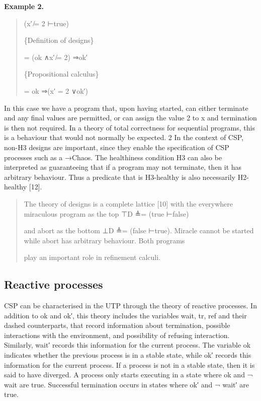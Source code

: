 \documentclass[11pt]{article}
\begin{document}
\noindent\textbf{Example 2.}


\begin{quote}\small\raggedright
(x′ ̸= 2 ⊢true)
\par
\{Definition of designs\}
\par
= (ok ∧x′ ̸= 2) ⇒ok′
\par
\{Propositional calculus\}
\par
= ok ⇒(x′ = 2 ∨ok′)
\end{quote}

In this case we have a program that, upon having started, can either terminate and any final values are permitted, or can assign the value 2 to x and termination is then not required. In a theory of total correctness for sequential programs, this is a behaviour that would not normally be expected. 2 In the context of CSP, non-H3 designs are important, since they enable the specification of CSP processes such as a →Chaos. The healthiness condition H3 can also be interpreted as guaranteeing that if a program may not terminate, then it has arbitrary behaviour. Thus a predicate that is H3-healthy is also necessarily H2-healthy [12].

\begin{quote}\small\raggedright
The theory of designs is a complete lattice [10] with the everywhere miraculous program as the top ⊤D ≜= (true ⊢false)
\par
and abort as the bottom ⊥D ≜= (false ⊢true). Miracle cannot be started while abort has arbitrary behaviour. Both programs
\par
play an important role in refinement calculi.
\end{quote}

\subsection{Reactive processes}
CSP can be characterised in the UTP through the theory of reactive processes. In addition to ok and ok′, this theory includes the variables wait, tr, ref and their dashed counterparts, that record information about termination, possible interactions with the environment, and possibility of refusing interaction. Similarly, wait′ records this information for the current process. The variable ok indicates whether the previous process is in a stable state, while ok′ records this information for the current process. If a process is not in a stable state, then it is said to have diverged. A process only starts executing in a state where ok and ¬ wait are true. Successful termination occurs in states where ok′ and ¬ wait′ are true.
\end{document}
